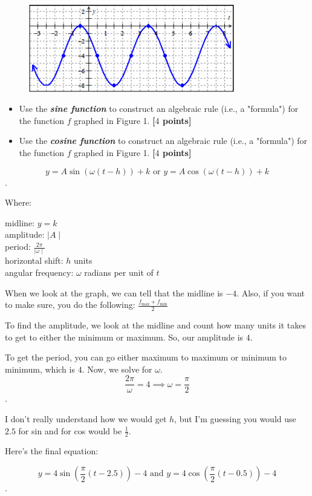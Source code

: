 \begin{problem}
  \begin{figure}[H]
    \centering
    \includegraphics[width=0.8\textwidth]{images/week-3a.png}
    \caption{}
    \label{fig:week_3a}
  \end{figure}

  \begin{itemize}
    \item Use the \textbf{\textit{sine function}} to construct an algebraic rule
      (i.e., a "formula") for the function $f$ graphed in Figure 1. \textbf{[$4$
      points]}
    \item Use the \textbf{\textit{cosine function}} to construct an algebraic
      rule (i.e., a "formula") for the function $f$ graphed in Figure 1.
      \textbf{[$4$ points]}
  \end{itemize}
\end{problem}

\begin{solution}
  \[
  y = A\sin(\omega(t - h)) + k \textrm{ or } y = A\cos(\omega(t - h)) + k
  \].

  Where:
  \begin{center}
    midline: $y = k$ \\
    amplitude:  $\mid A \mid$ \\
    period: $\frac{2\pi}{\mid \omega \mid}$ \\
    horizontal shift: $h$ units \\
    angular frequency: $\omega$ radians per unit of $t$
  \end{center}

  When we look at the graph, we can tell that the midline is $-4$. Also, if
  you want to make sure, you do the following:
  $\frac{f_{\textrm{max}} + f_{\textrm{min}}}{2}$

  To find the amplitude, we look at the midline and count how many units it
  takes to get to either the minimum or maximum. So, our amplitude is $4$.

  To get the period, you can go either maximum to maximum or minimum to
  minimum, which is $4$. Now, we solve for $\omega$.
  \[
  \frac{2\pi}{\omega} = 4 \implies \omega = \frac{\pi}{2}
  \].

  I don't really understand how we would get $h$, but I'm guessing you would
  use $2.5$ for sin and for cos would be $\frac{1}{2}$.

  Here's the final equation:

  \[
  y = 4\sin \left(\frac{\pi}{2}(t - 2.5)\right) - 4 \textrm{ and }
  y = 4\cos \left(\frac{\pi}{2}(t - 0.5)\right) - 4
  \].
\end{solution}

